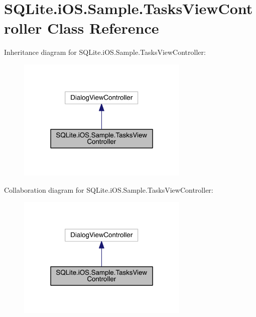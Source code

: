 \hypertarget{class_s_q_lite_1_1i_o_s_1_1_sample_1_1_tasks_view_controller}{\section{S\+Q\+Lite.\+i\+O\+S.\+Sample.\+Tasks\+View\+Controller Class Reference}
\label{class_s_q_lite_1_1i_o_s_1_1_sample_1_1_tasks_view_controller}
}


Inheritance diagram for S\+Q\+Lite.\+i\+O\+S.\+Sample.\+Tasks\+View\+Controller\+:
\nopagebreak
\begin{figure}[H]
\begin{center}
\leavevmode
\includegraphics[width=232pt]{class_s_q_lite_1_1i_o_s_1_1_sample_1_1_tasks_view_controller__inherit__graph}
\end{center}
\end{figure}


Collaboration diagram for S\+Q\+Lite.\+i\+O\+S.\+Sample.\+Tasks\+View\+Controller\+:
\nopagebreak
\begin{figure}[H]
\begin{center}
\leavevmode
\includegraphics[width=232pt]{class_s_q_lite_1_1i_o_s_1_1_sample_1_1_tasks_view_controller__coll__graph}
\end{center}
\end{figure}
